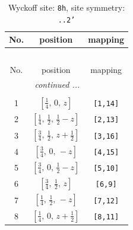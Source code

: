 \documentclass[fleqn,8pt]{jsarticle}
\begin{document}
\begin{longtable}{ccc}
\caption{Wyckoff site: {\tt 8h}, site symmetry: {\tt ..2'}}
 \\
 \hline \hline
No. & position & mapping \\ \hline \endfirsthead

\multicolumn{2}{l}{\tablename\ \thetable{}} \\
 \hline \hline
No. & position & mapping \\ \hline \endhead

 \hline \hline
\multicolumn{2}{r}{\footnotesize\it continued ...} \\ \endfoot

 \hline \hline
\multicolumn{2}{r}{} \\ \endlastfoot

1 & $\left[ \frac{1}{4},\, 0,\, z \right]$ & {\tt [1,14]} \\ \hline
2 & $\left[ \frac{1}{4},\, \frac{1}{2},\, \frac{1}{2} - z \right]$ & {\tt [2,13]} \\ \hline
3 & $\left[ \frac{3}{4},\, \frac{1}{2},\, z + \frac{1}{2} \right]$ & {\tt [3,16]} \\ \hline
4 & $\left[ \frac{3}{4},\, 0,\, - z \right]$ & {\tt [4,15]} \\ \hline
5 & $\left[ \frac{3}{4},\, 0,\, \frac{1}{2} - z \right]$ & {\tt [5,10]} \\ \hline
6 & $\left[ \frac{3}{4},\, \frac{1}{2},\, z \right]$ & {\tt [6,9]} \\ \hline
7 & $\left[ \frac{1}{4},\, \frac{1}{2},\, - z \right]$ & {\tt [7,12]} \\ \hline
8 & $\left[ \frac{1}{4},\, 0,\, z + \frac{1}{2} \right]$ & {\tt [8,11]} \\
\end{longtable}
\renewcommand{\arraystretch}{1.2}
\end{document}
